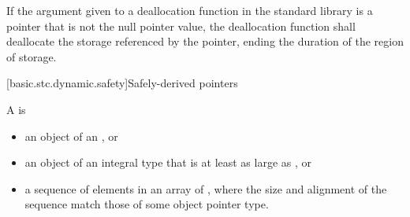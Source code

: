 \pnum
If the argument given to a deallocation function in the standard library
is a pointer that is not the null pointer value, the
deallocation function shall deallocate the storage referenced by the
pointer, ending the duration of the region of storage.

[basic.stc.dynamic.safety]{Safely-derived pointers}

\pnum
{}%
%
A  is
\begin{itemize}
\item an object of an , or
\item an object of an integral type that is at least as large as ,
or
\item a sequence of elements in an array of
, where the size and alignment of the sequence
match those of some object pointer type.
\end{itemize}

